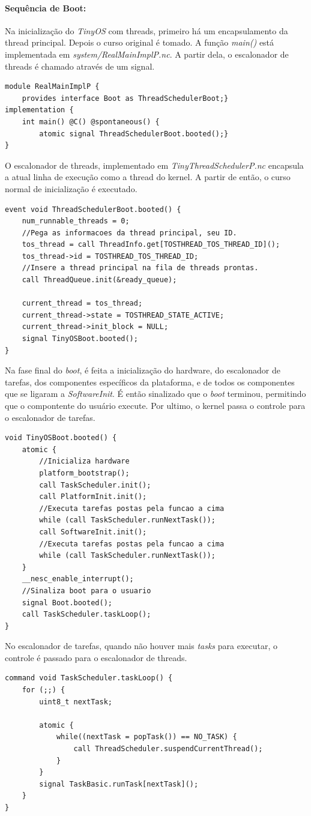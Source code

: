 \paragraph{Sequência de Boot:}
Na inicialização do \textit{TinyOS} com threads, primeiro há um encapsulamento da thread principal. Depois o curso
original é tomado.
A função \textit{main()} está implementada em \textit{system/RealMainImplP.nc}. A partir dela, o escalonador de threads
é chamado através de um signal.
\begin{lstlisting}
module RealMainImplP {
    provides interface Boot as ThreadSchedulerBoot;}
implementation {
    int main() @C() @spontaneous() {
        atomic signal ThreadSchedulerBoot.booted();}
}
\end{lstlisting}
O escalonador de threads, implementado em \textit{TinyThreadSchedulerP.nc} encapsula a atual linha de execução
como a thread do kernel. A partir de então, o curso normal de inicialização é executado. 
\begin{lstlisting}
event void ThreadSchedulerBoot.booted() {
    num_runnable_threads = 0;
    //Pega as informacoes da thread principal, seu ID.
    tos_thread = call ThreadInfo.get[TOSTHREAD_TOS_THREAD_ID]();
    tos_thread->id = TOSTHREAD_TOS_THREAD_ID;
    //Insere a thread principal na fila de threads prontas.
    call ThreadQueue.init(&ready_queue);

    current_thread = tos_thread;
    current_thread->state = TOSTHREAD_STATE_ACTIVE;
    current_thread->init_block = NULL;
    signal TinyOSBoot.booted();
}
\end{lstlisting}
Na fase final do \textit{boot}, é feita a inicialização do hardware, do escalonador de tarefas, dos componentes
específicos da plataforma, e de todos os componentes que se ligaram a \textit{SoftwareInit}. É então sinalizado que o 
\textit{boot} terminou, permitindo que o compontente do usuário execute. Por ultimo, o kernel passa o controle para o
escalonador de tarefas.
\begin{lstlisting}
void TinyOSBoot.booted() {
    atomic {
        //Inicializa hardware
        platform_bootstrap();
        call TaskScheduler.init();
        call PlatformInit.init();
        //Executa tarefas postas pela funcao a cima
        while (call TaskScheduler.runNextTask());
        call SoftwareInit.init();
        //Executa tarefas postas pela funcao a cima
        while (call TaskScheduler.runNextTask());
    }
    __nesc_enable_interrupt();
    //Sinaliza boot para o usuario
    signal Boot.booted();
    call TaskScheduler.taskLoop();
}
\end{lstlisting}
No escalonador de tarefas, quando não houver mais \textit{tasks} para executar, o controle é passado para o escalonador
de threads.
\begin{lstlisting}
command void TaskScheduler.taskLoop() {
    for (;;) {
        uint8_t nextTask;

        atomic {
            while((nextTask = popTask()) == NO_TASK) {
                call ThreadScheduler.suspendCurrentThread();
            }
        }
        signal TaskBasic.runTask[nextTask]();
    }
}
\end{lstlisting}

